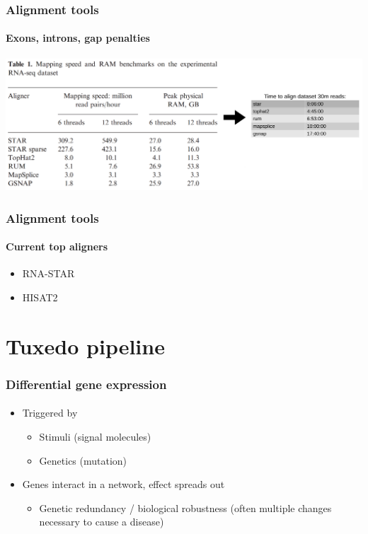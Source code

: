 \documentclass{beamer}			  %
\begin{document}
\begin{frame}
\frametitle{Alignment tools}
\framesubtitle{Exons, introns, gap penalties}
	\begin{center}
		\includegraphics[width=\textwidth]{figures/dge_06p.png}\\\cite{star}
	\end{center}
\end{frame}


\begin{frame}
\frametitle{Alignment tools}
\framesubtitle{Current top aligners}
	\begin{itemize}
		\item RNA-STAR\cite{star}
		\item HISAT2\cite{hisat}
	\end{itemize}
\end{frame}

\section{Tuxedo pipeline}

\begin{frame}
	\frametitle{Differential gene expression}
	\framesubtitle{}
	\begin{itemize}
		\item Triggered by
		\begin{itemize}
			\item Stimuli (signal molecules)
			\item Genetics (mutation)
		\end{itemize}
		\item Genes interact in a network, effect spreads out
		\begin{itemize}
			\item Genetic redundancy / biological robustness (often multiple changes necessary to cause a disease)
		\end{itemize}
	\end{itemize}
\end{frame}
  
\end{document}
